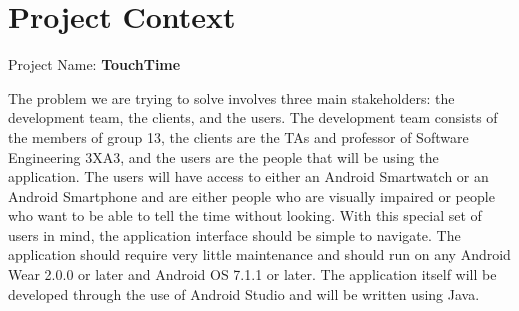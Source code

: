 \documentclass{article}
\begin{document}
\section{Project Context}
Project Name: 
\textbf{TouchTime}
\vspace{0.3cm}

The problem we are trying to solve involves three main stakeholders: the development team, the clients, and the users. The development team consists of the members of group 13, the clients are the TAs and professor of Software Engineering 3XA3, and the users are the people that will be using the application. The users will have access to either an Android Smartwatch or an Android Smartphone and are either people who are visually impaired or people who want to be able to tell the time without looking. With this special set of users in mind, the application interface should be simple to navigate. The application should require very little maintenance and should run on any Android Wear 2.0.0 or later and Android OS 7.1.1 or later. The application itself will be developed through the use of Android Studio and will be written using Java.






\end{document}
